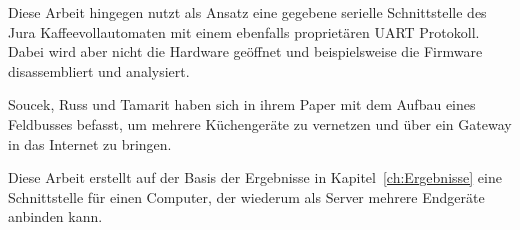 Diese Arbeit hingegen nutzt als Ansatz eine gegebene serielle Schnittstelle des Jura Kaffeevollautomaten mit einem ebenfalls proprietären \ac{UART} Protokoll.
Dabei wird aber nicht die Hardware geöffnet und beispielsweise die Firmware disassembliert und analysiert.

Soucek, Russ und Tamarit haben sich in ihrem Paper \cite{soucek2000smart} mit dem Aufbau eines Feldbusses befasst, um mehrere Küchengeräte zu vernetzen und über ein Gateway in das Internet zu bringen.

Diese Arbeit erstellt auf der Basis der Ergebnisse in Kapitel~\ref{ch:Ergebnisse} eine Schnittstelle für einen Computer, der wiederum als Server mehrere Endgeräte anbinden kann.

